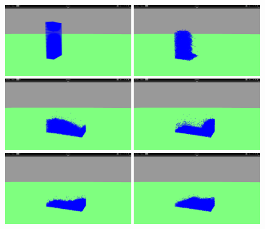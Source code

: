 \documentclass[polish, 12pt]{aghthesis}
\begin{document}
	\begin{figure}[h!]
		\centering
		\includegraphics[width=0.49\textwidth]{1.png}
		\includegraphics[width=0.49\textwidth]{2.png}
		\includegraphics[width=0.49\textwidth]{3.png}
		\includegraphics[width=0.49\textwidth]{4.png}
		\includegraphics[width=0.49\textwidth]{5.png}
		\includegraphics[width=0.49\textwidth]{6.png}

\end{figure}
\end{document}
